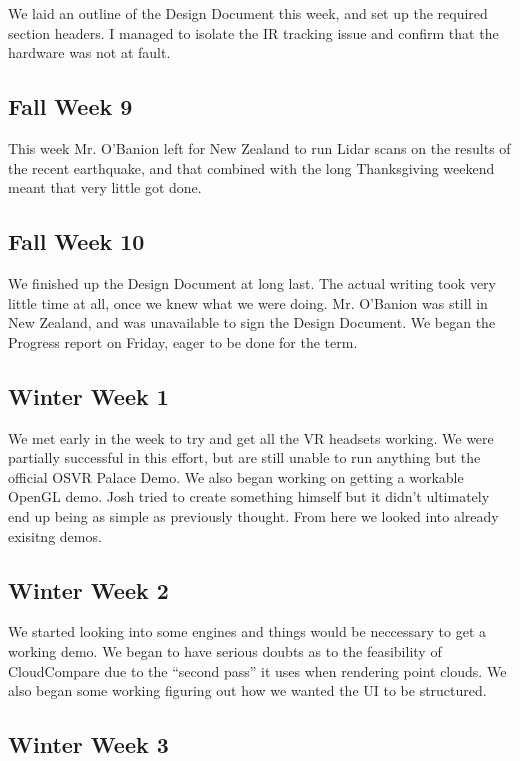 \documentclass[draftclsnofoot,onecolumn]{IEEEtran}
\begin{document}
We laid an outline of the Design Document this week, and set up the required section headers. 
I managed to isolate the IR tracking issue and confirm that the hardware was not at fault.

\subsection{Fall Week 9}

This week Mr. O'Banion left for New Zealand to run Lidar scans on the results of the recent earthquake, and that combined with the long Thanksgiving weekend meant that very little got done.

\subsection{Fall Week 10}

We finished up the Design Document at long last. The actual writing took very little time at all, once we knew what we were doing. 
Mr. O'Banion was still in New Zealand, and was unavailable to sign the Design Document. 
We began the Progress report on Friday, eager to be done for the term.

\subsection{Winter Week 1}

We met early in the week to try and get all the VR headsets working. 
We were partially successful in this effort, but are still unable to run anything but the official OSVR Palace Demo.
We also began working on getting a workable OpenGL demo.
Josh tried to create something himself but it didn't ultimately end up being as simple as previously thought.
From here we looked into already exisitng demos.

\subsection{Winter Week 2}

We started looking into some engines and things would be neccessary to get a working demo.
We began to have serious doubts as to the feasibility of CloudCompare due to the “second pass” it uses when rendering point clouds.
We also began some working figuring out how we wanted the UI to be structured.

\subsection{Winter Week 3}
\end{document}
